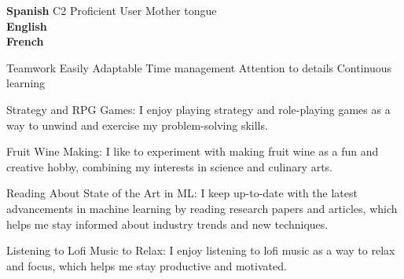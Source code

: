 \documentclass[9pt, blue]{./template/developercv} %
\begin{document}

\vspace{-8mm}
\begin{minipage}[t]{0.35\textwidth}
	\vspace{-\baselineskip} %

	\vspace{1.2mm}
	\small \textbf{Spanish} \hfill {\ssmall C2 Proficient User \cpipe Mother tongue \hspace{3pt}} \\

	\vspace{-0.5mm}
	\small \textbf{English} \hfill {} \\

	\vspace{-0.5mm}
	\small \textbf{French} \hfill {} \\



	\itemmarker Teamwork
	\itemmarker Easily Adaptable
	\itemmarker Time management
	\itemmarker Attention to details
	\itemmarker Continuous learning


	\itemmarker Strategy and RPG Games: I enjoy playing strategy and role-playing games as a way to unwind and exercise my problem-solving skills.

	\itemmarker Fruit Wine Making: I like to experiment with making fruit wine as a fun and creative hobby, combining my interests in science and culinary arts.

	\itemmarker Reading About State of the Art in ML: I keep up-to-date with the latest advancements in machine learning by reading research papers and articles, which helps me stay informed about industry trends and new techniques.

	\itemmarker Listening to Lofi Music to Relax: I enjoy listening to lofi music as a way to relax and focus, which helps me stay productive and motivated.

\end{minipage}
\end{document}
